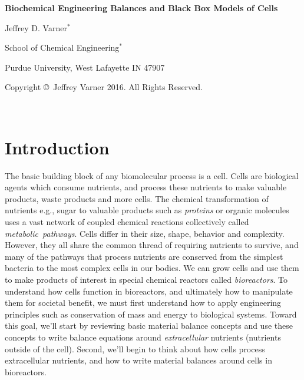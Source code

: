 \documentclass[11pt]{article}
\theoremstyle{definition}
\begin{document}
{\par\centering\textbf{\Large Biochemical Engineering Balances and Black Box Models of Cells}}
\vspace{0.2in}
{\par \centering \large{Jeffrey D. Varner$^{*}$}}
\vspace{0.05in}
{\par \centering \large{School of Chemical Engineering$^{*}$}}
{\par \centering \large{Purdue University, West Lafayette IN 47907}}
\vspace{0.1in}
{\par \centering \small{Copyright \copyright\ Jeffrey Varner 2016. All Rights Reserved.}}\\

\date{}
\thispagestyle{empty}

\setcounter{page}{1}


\section*{Introduction}
The basic building block of any biomolecular process is a cell. Cells are biological agents which consume nutrients, and process these nutrients to make valuable products,
waste products and more cells. The chemical transformation of nutrients e.g., sugar to valuable products such as \textit{proteins} or organic molecules uses a vast
network of coupled chemical reactions collectively called \textit{metabolic~pathways}.
Cells differ in their size, shape, behavior and complexity. However, they all share the common thread of requiring nutrients to survive, and many of the
pathways that process nutrients are conserved from the simplest bacteria to the most complex cells in our bodies.
We can grow cells and use them to make products of interest in special chemical reactors called \textit{bioreactors}.
To understand how cells function in bioreactors, and ultimately how to manipulate them for societal benefit, we must first understand how to apply engineering principles such as conservation of
mass and energy to biological systems. Toward this goal, we'll start by reviewing basic material balance concepts and use these concepts to write balance equations around \textit{extracellular} nutrients
(nutrients outside of the cell). Second, we'll begin to think about how cells process extracellular nutrients, and how to write material balances around cells in bioreactors.
\end{document}
